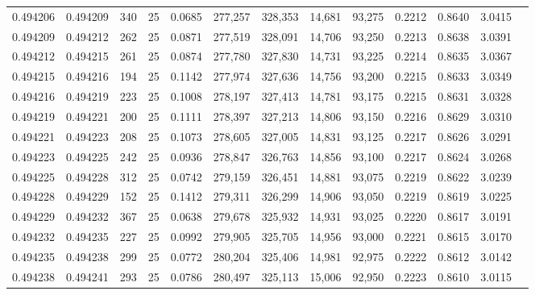 \begin{tabular}{rrrrrrrrrrrrr}
0.494206 & 0.494209 &   340 &  25 &                                     0.0685 & 277,257 & 328,353 &  14,681 &  93,275 & 0.2212 & 0.8640 & 3.0415 \\
0.494209 & 0.494212 &   262 &  25 &                                     0.0871 & 277,519 & 328,091 &  14,706 &  93,250 & 0.2213 & 0.8638 & 3.0391 \\
0.494212 & 0.494215 &   261 &  25 &                                     0.0874 & 277,780 & 327,830 &  14,731 &  93,225 & 0.2214 & 0.8635 & 3.0367 \\
0.494215 & 0.494216 &   194 &  25 &                                     0.1142 & 277,974 & 327,636 &  14,756 &  93,200 & 0.2215 & 0.8633 & 3.0349 \\
0.494216 & 0.494219 &   223 &  25 &                                     0.1008 & 278,197 & 327,413 &  14,781 &  93,175 & 0.2215 & 0.8631 & 3.0328 \\
0.494219 & 0.494221 &   200 &  25 &                                     0.1111 & 278,397 & 327,213 &  14,806 &  93,150 & 0.2216 & 0.8629 & 3.0310 \\
0.494221 & 0.494223 &   208 &  25 &                                     0.1073 & 278,605 & 327,005 &  14,831 &  93,125 & 0.2217 & 0.8626 & 3.0291 \\
0.494223 & 0.494225 &   242 &  25 &                                     0.0936 & 278,847 & 326,763 &  14,856 &  93,100 & 0.2217 & 0.8624 & 3.0268 \\
0.494225 & 0.494228 &   312 &  25 &                                     0.0742 & 279,159 & 326,451 &  14,881 &  93,075 & 0.2219 & 0.8622 & 3.0239 \\
0.494228 & 0.494229 &   152 &  25 &                                     0.1412 & 279,311 & 326,299 &  14,906 &  93,050 & 0.2219 & 0.8619 & 3.0225 \\
0.494229 & 0.494232 &   367 &  25 &                                     0.0638 & 279,678 & 325,932 &  14,931 &  93,025 & 0.2220 & 0.8617 & 3.0191 \\
0.494232 & 0.494235 &   227 &  25 &                                     0.0992 & 279,905 & 325,705 &  14,956 &  93,000 & 0.2221 & 0.8615 & 3.0170 \\
0.494235 & 0.494238 &   299 &  25 &                                     0.0772 & 280,204 & 325,406 &  14,981 &  92,975 & 0.2222 & 0.8612 & 3.0142 \\
0.494238 & 0.494241 &   293 &  25 &                                     0.0786 & 280,497 & 325,113 &  15,006 &  92,950 & 0.2223 & 0.8610 & 3.0115 \\

\end{tabular}
